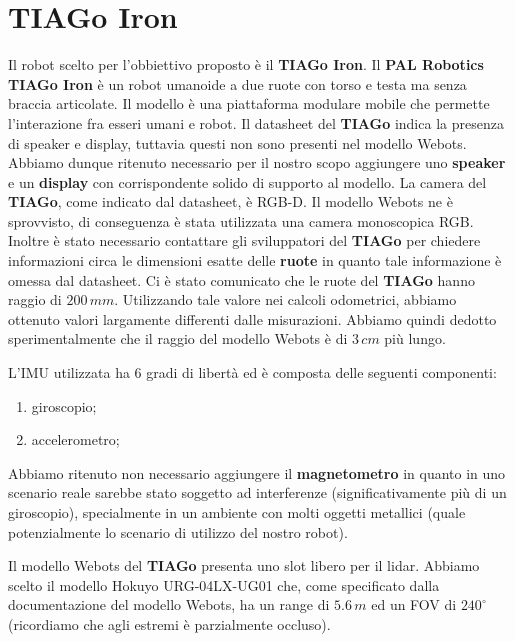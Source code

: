 \documentclass[a4paper]{article}
\begin{document}
	\section{TIAGo Iron}\label{sec:TIAGo-Iron} 
	Il robot scelto per l'obbiettivo proposto è il \textbf{TIAGo Iron}. \newline Il \textbf{PAL Robotics TIAGo Iron} \cite{tiagoiron} è un robot umanoide a due ruote con torso e testa ma senza braccia articolate. Il modello è una piattaforma modulare mobile che permette l'interazione fra esseri umani e robot. \newline
	Il datasheet del \textbf{TIAGo} indica la presenza di speaker e display, tuttavia questi non sono presenti nel modello Webots. Abbiamo dunque ritenuto necessario per il nostro scopo aggiungere uno \textbf{speaker} e un \textbf{display} con corrispondente solido di supporto al modello.
	La camera del \textbf{TIAGo}, come indicato dal datasheet, è RGB-D. Il modello Webots ne è sprovvisto, di conseguenza è stata utilizzata una camera monoscopica RGB.
	Inoltre è stato necessario contattare gli sviluppatori del \textbf{TIAGo} per chiedere informazioni circa le dimensioni esatte delle \textbf{ruote} in quanto tale informazione è omessa dal datasheet. Ci è stato comunicato che le ruote del \textbf{TIAGo} hanno raggio di $200\,mm$. Utilizzando tale valore nei calcoli odometrici, abbiamo ottenuto valori largamente differenti dalle misurazioni. Abbiamo quindi dedotto sperimentalmente che il raggio del modello Webots è di $3\,cm$ più lungo. 
	
    L'IMU utilizzata ha 6 gradi di libertà ed è composta delle seguenti componenti:
	\begin{enumerate}
		\item giroscopio;	
		\item accelerometro;
	\end{enumerate}
	Abbiamo ritenuto non necessario aggiungere il \textbf{magnetometro} in quanto in uno scenario reale sarebbe stato soggetto ad interferenze (significativamente più di un giroscopio), specialmente in un ambiente con molti oggetti metallici (quale potenzialmente lo scenario di utilizzo del nostro robot).
	
	Il modello Webots del \textbf{TIAGo} presenta uno slot libero per il lidar. Abbiamo scelto il modello Hokuyo URG-04LX-UG01 \cite{lidarspecs} che, come specificato dalla documentazione del modello Webots,  ha un range di $5.6\,m$ ed un FOV di $240^{\circ}$ (ricordiamo che agli estremi è parzialmente occluso).
\end{document}
